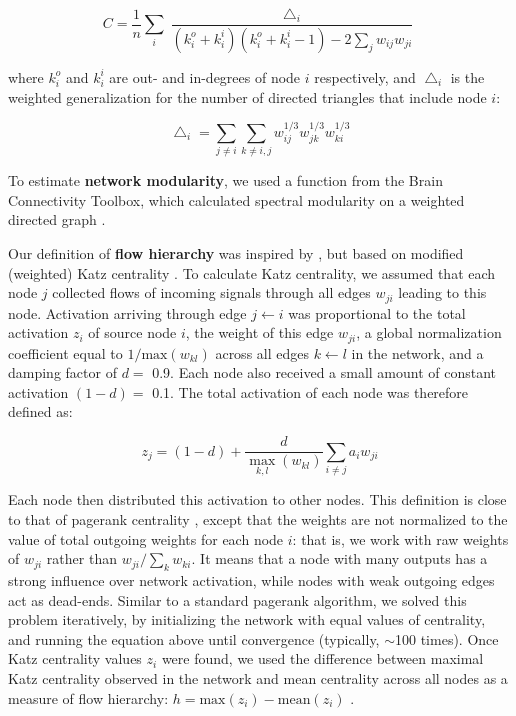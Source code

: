 \documentclass{article}
\begin{document}
\[ C = \frac{1}{n} \sum_i{\frac {\bigtriangleup_i}{(k^o_i+k^i_i)(k^o_i+k^i_i-1)-2\sum_j{w_{ij}w_{ji}}}} \]

where $k^o_i$ and $k^i_i$ are out- and in-degrees of node $i$ respectively, and $\bigtriangleup_i$ is the weighted generalization for the number of directed triangles that include node $i$:

\[ \bigtriangleup_i = \sum_{j \neq i}{\sum_{k \neq i,j}{w^{1/3}_{ij}w^{1/3}_{jk}w^{1/3}_{ki}}} \]

To estimate \textbf{network modularity}, we used a function from the Brain Connectivity Toolbox, which calculated spectral modularity on a weighted directed graph \citep{reichardt2006community,leicht2008community}.

Our definition of \textbf{flow hierarchy} was inspired by \citep{mones2012hierarchy,czegel2015hierarchy}, but based on modified (weighted) Katz centrality \citep{katz1953original,fletcher2018katz}. To calculate Katz centrality, we assumed that each node $j$ collected flows of incoming signals through all edges $w_{ji}$ leading to this node. Activation arriving through edge $j\leftarrow i$ was proportional to the total activation $z_i$ of source node $i$, the weight of this edge $w_{ji}$, a global normalization coefficient equal to $1/\text{max}(w_{kl})$ across all edges $k\leftarrow l$ in the network, and a damping factor of $d=$ 0.9. Each node also received a small amount of constant activation $(1-d)=$ 0.1. The total activation of each node was therefore defined as:

\[ z_j = (1-d) + \frac{d}{\max\limits_{k,l}(w_{kl})} \sum_{i \neq j}{a_i w_{ji}} \]

Each node then distributed this activation to other nodes. This definition is close to that of pagerank centrality \citep{page1999pagerank}, except that the weights are not normalized to the value of total outgoing weights for each node $i$: that is, we work with raw weights of $w_{ji}$ rather than $w_{ji}/\sum_k{w_{ki}}$. It means that a node with many outputs has a strong influence over network activation, while nodes with weak outgoing edges act as dead-ends. Similar to a standard pagerank algorithm, we solved this problem iteratively, by initializing the network with equal values of centrality, and running the equation above until convergence (typically, $\sim$100 times). Once Katz centrality values $z_i$ were found, we used the difference between maximal Katz centrality observed in the network and mean centrality across all nodes as a measure of flow hierarchy: $h = \text{max}(z_i) - \text{mean}(z_i)$ \citep{mones2012hierarchy, czegel2015hierarchy}.
\end{document}
